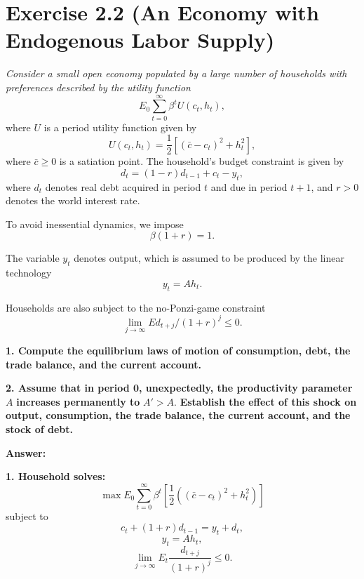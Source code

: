 \documentclass{article}
\begin{document}
\section*{Exercise 2.2 (An Economy with Endogenous Labor Supply)}

\textit{Consider a small open economy populated by a large number of households with preferences described by the utility function}
\begin{equation}
    E_0 \sum_{t=0}^{\infty} \beta^t U(c_t, h_t),
\end{equation}
where $U$ is a period utility function given by
\begin{equation}
    U(c_t, h_t) = \frac{1}{2} [(\bar{c} - c_t)^2 + h_t^2],
\end{equation}
where $\bar{c} \geq 0$ is a satiation point. The household's budget constraint is given by
\begin{equation}
    d_t = (1 - r)d_{t-1} + c_t - y_t,
\end{equation}
where $d_t$ denotes real debt acquired in period $t$ and due in period $t+1$, and $r > 0$ denotes the world interest rate.

To avoid inessential dynamics, we impose
\begin{equation}
    \beta(1 + r) = 1.
\end{equation}

The variable $y_t$ denotes output, which is assumed to be produced by the linear technology
\begin{equation}
    y_t = A h_t.
\end{equation}

Households are also subject to the no-Ponzi-game constraint
\begin{equation}
    \lim_{j \to \infty} E d_{t+j} / (1 + r)^j \leq 0.
\end{equation}

\textbf{1. Compute the equilibrium laws of motion of consumption, debt, the trade balance, and the current account.}

\textbf{2. Assume that in period 0, unexpectedly, the productivity parameter} $A$ \textbf{increases permanently to} $A' > A$. \textbf{Establish the effect of this shock on output, consumption, the trade balance, the current account, and the stock of debt.}

\textbf{Answer:}

\textbf{1. Household solves:}
\begin{equation}
    \max E_0 \sum_{t=0}^{\infty} \beta^t \left[ \frac{1}{2} ((\bar{c} - c_t)^2 + h_t^2) \right]
\end{equation}
subject to
\begin{equation}
    c_t + (1 + r)d_{t-1} = y_t + d_t,
\end{equation}
\begin{equation}
    y_t = A h_t,
\end{equation}
\begin{equation}
    \lim_{j \to \infty} E_t \frac{d_{t+j}}{(1 + r)^j} \leq 0.
\end{equation}
\end{document}
